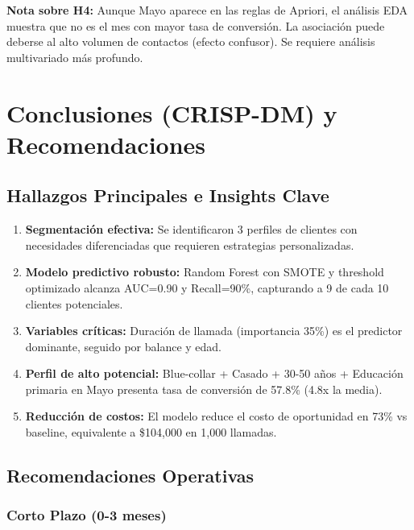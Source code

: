 \documentclass[12pt,letterpaper]{article}
\begin{document}
\textbf{Nota sobre H4:} Aunque Mayo aparece en las reglas de Apriori, el análisis EDA muestra que no es el mes con mayor tasa de conversión. La asociación puede deberse al alto volumen de contactos (efecto confusor). Se requiere análisis multivariado más profundo.

\newpage
\section{Conclusiones (CRISP-DM) y Recomendaciones}

\subsection{Hallazgos Principales e Insights Clave}

\begin{enumerate}
    \item \textbf{Segmentación efectiva:} Se identificaron 3 perfiles de clientes con necesidades diferenciadas que requieren estrategias personalizadas.
    
    \item \textbf{Modelo predictivo robusto:} Random Forest con SMOTE y threshold optimizado alcanza AUC=0.90 y Recall=90\%, capturando a 9 de cada 10 clientes potenciales.
    
    \item \textbf{Variables críticas:} Duración de llamada (importancia 35\%) es el predictor dominante, seguido por balance y edad.
    
    \item \textbf{Perfil de alto potencial:} Blue-collar + Casado + 30-50 años + Educación primaria en Mayo presenta tasa de conversión de 57.8\% (4.8x la media).
    
    \item \textbf{Reducción de costos:} El modelo reduce el costo de oportunidad en 73\% vs baseline, equivalente a \$104,000 en 1,000 llamadas.
\end{enumerate}

\subsection{Recomendaciones Operativas}

\subsubsection{Corto Plazo (0-3 meses)}
\end{document}
